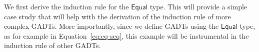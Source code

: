 \documentclass[acmsmall,screen,review,anonymous]{acmart}
\theoremstyle{definition}
\begin{document}

We first derive the induction rule for the $\mathsf{Equal}$ type.
This will provide a simple case study that will help with the derivation of the induction rule of more complex GADTs.
More importantly, since we define GADTs using the $\mathsf{Equal}$ type,
as for example in Equation~\ref{eq:eq-seq},
this example will be instrumental in the induction rule of other GADTs.

\end{document}
